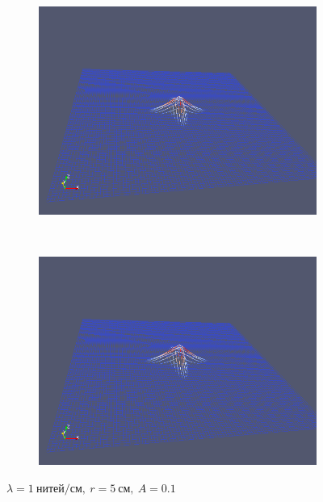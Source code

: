 \begin{figure}[H]
\begin{subfigure}[t]{0.5\textwidth}
        \includegraphics[width=\textwidth]{img/fiber/density_1_radius_5_amplitude_0.1/5.png}
    \end{subfigure}%
    ~
    \begin{subfigure}[t]{0.5\textwidth}
        \centering
        \includegraphics[width=\textwidth]{img/fiber/density_1_radius_5_amplitude_0.1/6.png}
    \end{subfigure}
    \caption{$\lambda=1~нитей/см,~r=5~см,~A=0.1$}
\end{figure}
